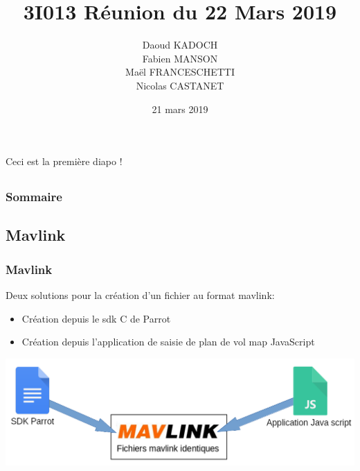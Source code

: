 \documentclass{beamer}
\title{3I013 Réunion du 22 Mars 2019}
\author{Daoud KADOCH\\Fabien MANSON\\Maël FRANCESCHETTI\\Nicolas CASTANET\\}
\begin{document}
	\begin{frame}
		\begin{center}
		\date{21 mars 2019}
		\maketitle
		Ceci est la première diapo !\\
		\end{center}
	\end{frame}
	
	
	
	\begin{frame}
		\section{}
		\begin{flushleft}
		\frametitle{Sommaire}
		\tableofcontents{}
		\end{flushleft}
	\end{frame}
	
	
	\begin{frame}
	\section{Mavlink}
		\begin{center}
		\frametitle{Mavlink}
        Deux solutions pour la création d'un fichier au format mavlink:
        
           	\begin{itemize}
                \item Création depuis le sdk C de Parrot
                \item Création depuis l'application de saisie de plan de vol map JavaScript
            \end{itemize}
            \includegraphics[scale=0.40]{schema_js_vs_sdk.png}
		\end{center}
	\end{frame}
	
\end{document}
